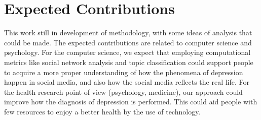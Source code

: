 \section{Expected Contributions}

This work still in development of methodology, with some ideas of analysis that could be made. 
The expected contributions are related to computer science and psychology.
For the computer science, we expect that employing computational metrics like social network analysis and topic classification could support people to acquire a more proper understanding of how the phenomena of depression happen in social media, and also how the social media reflects the real life. 
For the health research point of view (psychology, medicine), our approach could improve how the diagnosis of depression is performed. This could aid people with few resources to enjoy a better health by the use of technology.